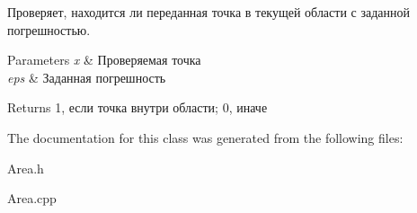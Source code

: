 Проверяет, находится ли переданная точка в текущей области с заданной погрешностью. 
\begin{DoxyParams}{Parameters}
{\em x} & Проверяемая точка \\
\hline
{\em eps} & Заданная погрешность \\
\hline
\end{DoxyParams}
\begin{DoxyReturn}{Returns}
1, если точка внутри области; 0, иначе 
\end{DoxyReturn}


The documentation for this class was generated from the following files\+:\begin{DoxyCompactItemize}
\item 
Area.\+h\item 
Area.\+cpp\end{DoxyCompactItemize}
